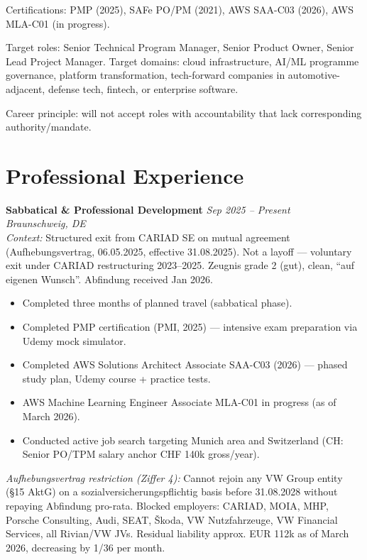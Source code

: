 \documentclass[10pt,a4paper]{article}
\newcommand{\roleentry}[3]{%
  \vspace{4pt}%
  \textbf{#1} \hfill \textit{#2}\\%
  \textit{\small #3}\\[-2pt]%
}
\begin{document}
Certifications: PMP (2025), SAFe PO/PM (2021), AWS SAA-C03 (2026), AWS MLA-C01 (in progress).

Target roles: Senior Technical Program Manager, Senior Product Owner, Senior Lead Project Manager.
Target domains: cloud infrastructure, AI/ML programme governance, platform transformation, tech-forward
companies in automotive-adjacent, defense tech, fintech, or enterprise software.

Career principle: will not accept roles with accountability that lack corresponding authority/mandate.

\section{Professional Experience}

\roleentry{Sabbatical \& Professional Development}
  {Sep 2025 – Present}
  {Braunschweig, DE}

\textit{Context:} Structured exit from CARIAD SE on mutual agreement (Aufhebungsvertrag, 06.05.2025,
effective 31.08.2025). Not a layoff — voluntary exit under CARIAD restructuring 2023–2025.
Zeugnis grade 2 (gut), clean, ``auf eigenen Wunsch''. Abfindung received Jan 2026.

\begin{itemize}
  \item Completed three months of planned travel (sabbatical phase).
  \item Completed PMP certification (PMI, 2025) — intensive exam preparation via Udemy mock simulator.
  \item Completed AWS Solutions Architect Associate SAA-C03 (2026) — phased study plan, Udemy course + practice tests.
  \item AWS Machine Learning Engineer Associate MLA-C01 in progress (as of March 2026).
  \item Conducted active job search targeting Munich area and Switzerland (CH: Senior PO/TPM salary anchor CHF 140k gross/year).
\end{itemize}

\textit{Aufhebungsvertrag restriction (Ziffer 4):} Cannot rejoin any VW Group entity (§15 AktG)
on a sozialversicherungspflichtig basis before 31.08.2028 without repaying Abfindung pro-rata.
Blocked employers: CARIAD, MOIA, MHP, Porsche Consulting, Audi, SEAT, Škoda, VW Nutzfahrzeuge,
VW Financial Services, all Rivian/VW JVs. Residual liability approx. EUR 112k as of March 2026,
decreasing by 1/36 per month.
\end{document}
